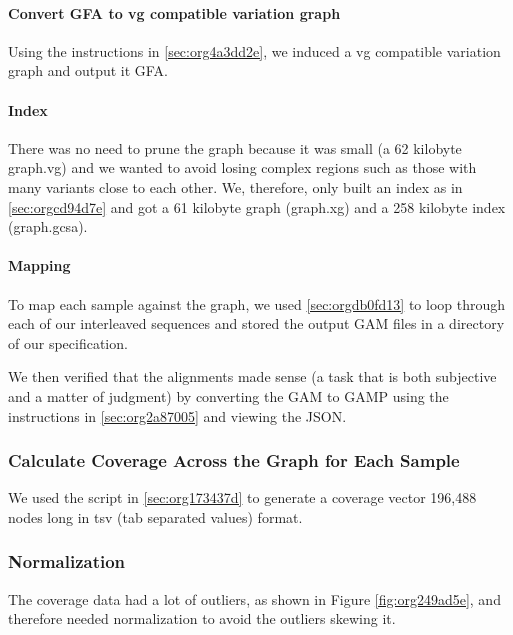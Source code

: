 \documentclass[10pt, a4paper]{article}
\begin{document}
\paragraph{Convert GFA to vg compatible variation graph}
\label{sec:org143f296}
Using the instructions in \ref{sec:org4a3dd2e}, we induced a vg 
\cite{garrisonVariationGraphToolkit2018} compatible variation graph and output it 
GFA.

\paragraph{Index}
\label{sec:org62609a6}
There was no need to prune the graph because it was small 
(a 62 kilobyte graph.vg) and we wanted to avoid losing complex regions such as 
those with many variants close to each other.
We, therefore, only built an index as in \ref{sec:orgcd94d7e} and got a 61
kilobyte graph (graph.xg) and a 258 kilobyte index (graph.gcsa).

\paragraph{Mapping}
\label{sec:org9faf797}
To map each sample against the graph, we used \ref{sec:orgdb0fd13} to loop through 
each of our interleaved sequences and stored the output GAM files in a 
directory of our specification.

We then verified that the alignments made sense
(a task that is both subjective and a matter of judgment) by converting the GAM 
to GAMP using the instructions in  \ref{sec:org2a87005} and viewing the JSON.

\subsubsection{Calculate Coverage Across the Graph for Each Sample}
\label{sec:orgf156820}
We used the script in \ref{sec:org173437d} to generate a coverage vector 196,488 nodes
long in tsv (tab separated values) format.

\subsubsection{Normalization}
\label{sec:org6f9e14a}
The coverage data had a lot of outliers, as shown in Figure
\ref{fig:org249ad5e}, and therefore needed normalization to avoid the outliers
skewing it.
\end{document}
